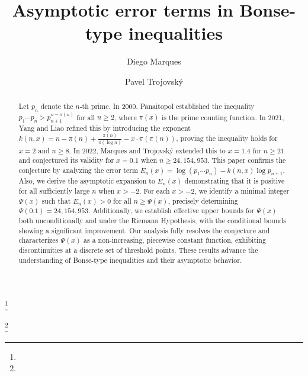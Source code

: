 \documentclass[10pt]{amsart}
\theoremstyle{definition} %
\numberwithin{equation}{section}
\begin{document}
\title[Asymptotic error terms in Bonse-type inequalities]{Asymptotic error terms in Bonse-type inequalities}


\author{Diego Marques}
\address{Departamento de Matem\' atica, Universidade  de Bras\' ilia, 70910-900, Brazil}
\curraddr{}
\thanks{}

\author{Pavel Trojovsk\'y}
\address{Department of Mathematics, Faculty of Science, University of Hradec Kr\' alov\' e, Rokitansk\'{e}ho 62, Hradec Kr\' alov\' e 50003, Czech Republic}
\curraddr{}
\thanks{}


\date{}

\dedicatory{}

\begin{abstract}
Let $p_n$ denote the $n$-th prime. In 2000, Panaitopol established the inequality $p_1 \cdots p_n > p_{n+1}^{n - \pi(n)}$ for all $n \geq 2$, where $\pi(x)$ is the prime counting function. In 2021, Yang and Liao refined this by introducing the exponent $k(n,x) = n - \pi(n) + \frac{\pi(n)}{\pi(\log n)} - x \cdot \pi(\pi(n))$, proving the inequality holds for $x = 2$ and $n \geq 8$. In 2022, Marques and Trojovský extended this to $x = 1.4$ for $n \geq 21$ and conjectured its validity for $x = 0.1$ when $n \geq 24,154,953$. This paper confirms the conjecture by analyzing the error term $E_n(x) = \log(p_1 \cdots p_n) - k(n,x) \log p_{n+1}$. Also, we derive the asymptotic expansion to $E_n(x)$ demonstrating that it is positive for all sufficiently large $n$ when $x > -2$. For each $x > -2$, we identify a minimal integer $\Psi(x)$ such that $E_n(x) > 0$ for all $n \geq \Psi(x)$, precisely determining $\Psi(0.1) = 24,154,953$. Additionally, we establish effective upper bounds for $\Psi(x)$ both unconditionally and under the Riemann Hypothesis, with the conditional bounds showing a significant improvement. Our analysis fully resolves the conjecture and characterizes $\Psi(x)$ as a non-increasing, piecewise constant function, exhibiting discontinuities at a discrete set of threshold points. These results advance the understanding of Bonse-type inequalities and their asymptotic behavior.
\end{abstract}
\end{document}
